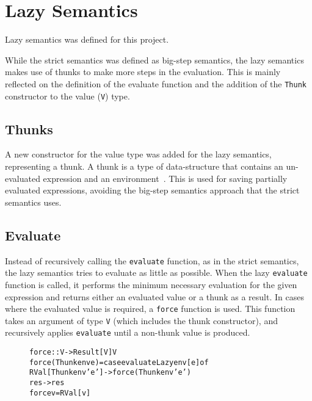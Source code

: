 \section{Lazy Semantics}
\label{LazySem}
Lazy semantics was defined for this project.

While the strict semantics was defined as big-step semantics, the lazy semantics
makes use of thunks to make more steps in the evaluation.
This is mainly reflected on the definition of the evaluate function
and the addition of the \texttt{Thunk} constructor to the value (\texttt{V})
type.

\subsection{Thunks}
A new constructor for the value type was added for the lazy semantics, representing
a thunk. A thunk is a type of data-structure that contains an un-evaluated expression
and an environment~\cite{Takano:2015:TRL:2695664.2695693}. This is used for saving
partially evaluated expressions, avoiding the big-step semantics approach that
the strict semantics uses.

\subsection{Evaluate}
\label{Eval}
Instead of recursively calling the \texttt{evaluate} function, as
in the strict semantics, the lazy semantics tries to evaluate as little as possible.
When the lazy \texttt{evaluate} function is called, it performs the minimum necessary evaluation
for the given expression and returns either an evaluated value or a thunk as a result.
In cases where the evaluated value is required, a \texttt{force} function is used.
This function takes an argument of type \texttt{V} (which includes the thunk constructor),
and recursively applies \texttt{evaluate} until a non-thunk value is produced.

\begin{figure}[!ht]
\begin{alltt}
force :: V -> Result [V] V
force (Thunk env e) = case evaluateLazy env [e] of
  RVal [Thunk env' e'] -> force (Thunk env' e')
  res -> res
force v = RVal [v]
\end{alltt}
\end{figure}

